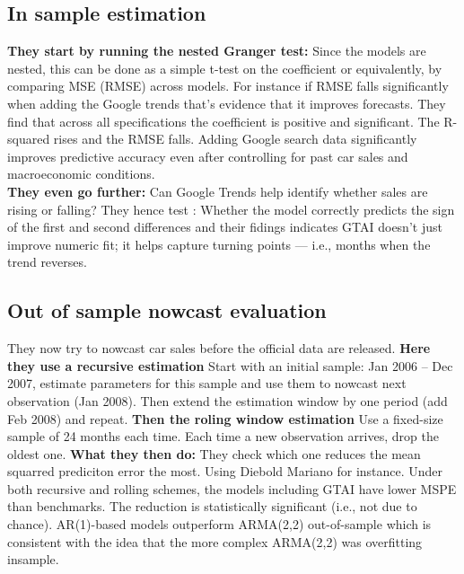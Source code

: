\documentclass{article}
\begin{document}
\subsection{In sample estimation}
\textbf{They start by running the nested Granger test: }Since the models are nested, this can be done as a simple t-test on the coefficient or equivalently, by comparing MSE (RMSE) across models. For instance if RMSE falls significantly when adding the Google trends that’s evidence that it improves forecasts.
They find that across all specifications the coefficient is positive and significant. The R-squared rises and the RMSE falls. Adding Google search data significantly improves predictive accuracy even after controlling for past car sales and macroeconomic conditions.\\
\textbf{They even go further:}
Can Google Trends help identify whether sales are rising or falling? They hence test : Whether the model correctly predicts the sign of the first and second differences and their fidings indicates GTAI doesn’t just improve numeric fit; it helps capture turning points — i.e., months when the trend reverses.


\subsection{Out of sample nowcast evaluation}
They now try to nowcast car sales before the official data are released.
\textbf{Here they use a recursive estimation}
Start with an initial sample: Jan 2006 – Dec 2007, estimate parameters for this sample and use them to nowcast next observation (Jan 2008). Then extend the estimation window by one period (add Feb 2008) and repeat.
\textbf{Then the roling window estimation}
Use a fixed-size sample of 24 months each time. Each time a new observation arrives, drop the oldest one.
\textbf{What they then do:}
They check which one reduces the mean squarred prediciton error the most. Using Diebold Mariano for instance.
Under both recursive and rolling schemes, the models including 
GTAI have lower MSPE than benchmarks. The reduction is statistically significant (i.e., not due to chance). AR(1)-based models outperform ARMA(2,2) out-of-sample which is consistent with the idea that the more complex ARMA(2,2) was overfitting insample.
\end{document}
